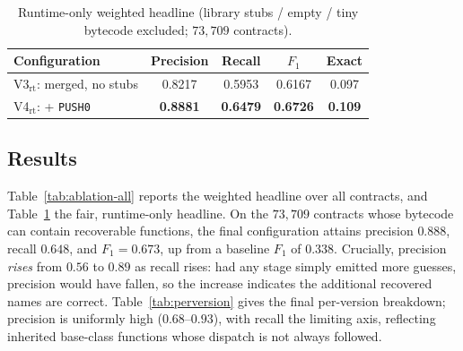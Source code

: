 \documentclass{article}
\begin{document}
\begin{table}[t]
\centering
\caption{Runtime-only weighted headline (library stubs / empty / tiny bytecode
excluded; $73{,}709$ contracts).}
\label{tab:ablation-rt}
\small
\begin{tabular}{l c c c c}
\toprule
Configuration & Precision & Recall & $F_1$ & Exact \\
\midrule
V3$_{\text{rt}}$: merged, no stubs & 0.8217 & 0.5953 & 0.6167 & 0.097 \\
V4$_{\text{rt}}$: + \texttt{PUSH0} & \textbf{0.8881} & \textbf{0.6479} & \textbf{0.6726} & \textbf{0.109} \\
\bottomrule
\end{tabular}
\end{table}

\subsection{Results}

Table~\ref{tab:ablation-all} reports the weighted headline over all contracts, and
Table~\ref{tab:ablation-rt} the fair, runtime-only headline. On the $73{,}709$
contracts whose bytecode can contain recoverable functions, the final
configuration attains precision $0.888$, recall $0.648$, and $F_1=0.673$, up from
a baseline $F_1$ of $0.338$. Crucially, precision \emph{rises} from $0.56$ to
$0.89$ as recall rises: had any stage simply emitted more guesses, precision would
have fallen, so the increase indicates the additional recovered names are correct.
Table~\ref{tab:perversion} gives the final per-version breakdown; precision is
uniformly high ($0.68$--$0.93$), with recall the limiting axis, reflecting
inherited base-class functions whose dispatch is not always followed.
\end{document}

